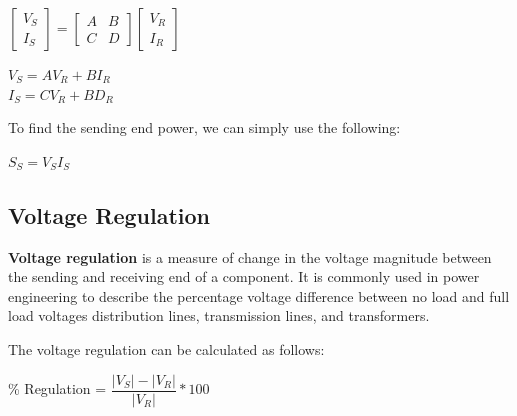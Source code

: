 \documentclass[a4paper,12pt]{article}
\begin{document}
    \begin{center}
      \begin{math}
        \begin{bmatrix}
          V_S \\ I_S
        \end{bmatrix}
        =
        \begin{bmatrix}
          A & B \\
          C & D 
        \end{bmatrix}
        \begin{bmatrix}
          V_R \\ I_R
        \end{bmatrix}
      \end{math}
      \vspace{12pt}

      $ V_S = A V_R  + B I_R $\\
      $ I_S = C V_R  + B D_R $
    \end{center}

  To find the sending end power, we can simply use the following:

    \begin{center}
      \begin{math}
        S_S = V_S I_S
      \end{math}
    \end{center}

    \subsection*{Voltage Regulation}
    {\bf Voltage regulation} is a measure of change in the voltage magnitude 
    between the sending and receiving end of a component. 
    It is commonly used in power engineering to describe the percentage 
    voltage difference between no load and full load voltages distribution 
    lines, transmission lines, and transformers.

    The voltage regulation can be calculated as follows:

      \begin{center}
        \% Regulation = $ \dfrac{|V_S| - |V_R|}{|V_R|} * 100 $
      \end{center}
\end{document}
